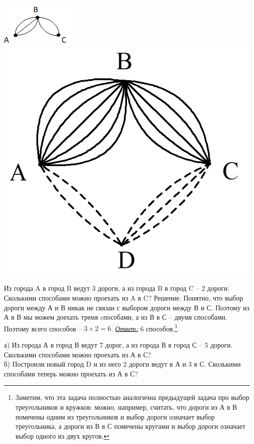 \begin{floatingfigure}[r]{0.2\textwidth}
	\includegraphics[scale=5]{./img/ways}
	\includegraphics[scale=0.13]{./img/ways2}
\end{floatingfigure}
\begin{prf} Из города A в город B ведут 3 дороги, а из города B в город C – 2 дороги. Сколькими способами можно проехать из A в C? 
	Решение. Понятно, что выбор дороги между А и В никак не связан с выбором дороги между В и С. Поэтому из А в В мы можем доехать тремя cпособами, а из В в С – двумя способами. Поэтому всего способов – $3 \times 2 = 6$. \underline{\textit{Ответ:}} 6 способов.\footnote{Заметим, что эта задача полностью аналогична предыдущей задача про выбор треугольников и кружков: можно, например, считать, что дороги из А в В помечены одним из треугольников и выбор дороги означает выбор треугольника, а дороги из В в С помечены кругами и выбор дороги означает выбор одного из двух кругов.}
\end{prf}
\begin{floatingfigure}[L]{0\textwidth}
\end{floatingfigure}
\begin{ex}\label{u14}
	а) Из города А в город В ведут 7 дорог, а из города В в город С – 5 дороги. Сколькими способами можно проехать из А в С?
	\\	
	б) Построили новый город D и из него 2 дороги ведут в А и 3 в С. Сколькими способами теперь можно проехать из А в С?
\end{ex}

